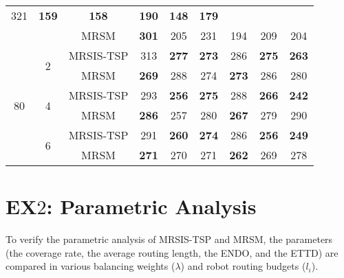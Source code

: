 \begin{table}[]
\begin{tabular}{|c|c|c|cccccc|}
  \multicolumn{1}{c|}{321} &
  \multicolumn{1}{c|}{\textbf{159}} &
  \multicolumn{1}{c|}{\textbf{158}} &
  \multicolumn{1}{c|}{\textbf{190}} &
  \multicolumn{1}{c|}{\textbf{148}} &
  \textbf{179} \\ \cline{3-9}
 &
   &
  MRSM &
  \multicolumn{1}{c|}{\textbf{301}} &
  \multicolumn{1}{c|}{205} &
  \multicolumn{1}{c|}{231} &
  \multicolumn{1}{c|}{194} &
  \multicolumn{1}{c|}{209} &
  204 \\ \hline\hline
\multirow{6}{*}{80} &
  \multirow{2}{*}{2} &
  MRSIS-TSP\cite{li2024mrsis} &
  \multicolumn{1}{c|}{313} &
  \multicolumn{1}{c|}{\textbf{277}} &
  \multicolumn{1}{c|}{\textbf{273}} &
  \multicolumn{1}{c|}{286} &
  \multicolumn{1}{c|}{\textbf{275}} &
  \textbf{263} \\ \cline{3-9}
 &
   &
  MRSM &
  \multicolumn{1}{c|}{\textbf{269}} &
  \multicolumn{1}{c|}{288} &
  \multicolumn{1}{c|}{274} &
  \multicolumn{1}{c|}{\textbf{273}} &
  \multicolumn{1}{c|}{286} &
  280 \\ \cline{2-9}
 &
  \multirow{2}{*}{4} &
  MRSIS-TSP\cite{li2024mrsis} &
  \multicolumn{1}{c|}{293} &
  \multicolumn{1}{c|}{\textbf{256}} &
  \multicolumn{1}{c|}{\textbf{275}} &
  \multicolumn{1}{c|}{288} &
  \multicolumn{1}{c|}{\textbf{266}} &
  \textbf{242} \\ \cline{3-9}
 &
   &
  MRSM &
  \multicolumn{1}{c|}{\textbf{286}} &
  \multicolumn{1}{c|}{257} &
  \multicolumn{1}{c|}{280} &
  \multicolumn{1}{c|}{\textbf{267}} &
  \multicolumn{1}{c|}{279} &
  290 \\ \cline{2-9}
 &
  \multirow{2}{*}{6} &
  MRSIS-TSP\cite{li2024mrsis} &
  \multicolumn{1}{c|}{291} &
  \multicolumn{1}{c|}{\textbf{260}} &
  \multicolumn{1}{c|}{\textbf{274}} &
  \multicolumn{1}{c|}{286} &
  \multicolumn{1}{c|}{\textbf{256}} &
  \textbf{249} \\ \cline{3-9}
 &
   &
  MRSM &
  \multicolumn{1}{c|}{\textbf{271}} &
  \multicolumn{1}{c|}{270} &
  \multicolumn{1}{c|}{271} &
  \multicolumn{1}{c|}{\textbf{262}} &
  \multicolumn{1}{c|}{269} &
  278 \\ \hline
\end{tabular}
\end{table}



\section{EX$2$: Parametric Analysis}
To verify the parametric analysis of MRSIS-TSP\cite{li2024mrsis} and MRSM, the parameters (the coverage rate, the average routing length, the ENDO, and the ETTD) are compared in various balancing weights ($\lambda$) and robot routing budgets ($l_i$).

